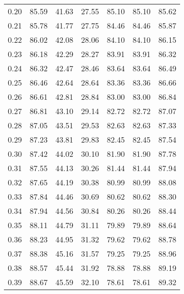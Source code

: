 \begin{tabular}{|c|c|c|c|c|c|c|}
      0.20 &     85.59 &     41.63 &      27.55 &   85.10 &      85.10 &         85.62 \\
      0.21 &     85.78 &     41.77 &      27.75 &   84.46 &      84.46 &         85.87 \\
      0.22 &     86.02 &     42.08 &      28.06 &   84.10 &      84.10 &         86.15 \\
      0.23 &     86.18 &     42.29 &      28.27 &   83.91 &      83.91 &         86.32 \\
      0.24 &     86.32 &     42.47 &      28.46 &   83.64 &      83.64 &         86.49 \\
      0.25 &     86.46 &     42.64 &      28.64 &   83.36 &      83.36 &         86.66 \\
      0.26 &     86.61 &     42.81 &      28.84 &   83.00 &      83.00 &         86.84 \\
      0.27 &     86.81 &     43.10 &      29.14 &   82.72 &      82.72 &         87.07 \\
      0.28 &     87.05 &     43.51 &      29.53 &   82.63 &      82.63 &         87.33 \\
      0.29 &     87.23 &     43.81 &      29.83 &   82.45 &      82.45 &         87.54 \\
      0.30 &     87.42 &     44.02 &      30.10 &   81.90 &      81.90 &         87.78 \\
      0.31 &     87.55 &     44.13 &      30.26 &   81.44 &      81.44 &         87.94 \\
      0.32 &     87.65 &     44.19 &      30.38 &   80.99 &      80.99 &         88.08 \\
      0.33 &     87.84 &     44.46 &      30.69 &   80.62 &      80.62 &         88.30 \\
      0.34 &     87.94 &     44.56 &      30.84 &   80.26 &      80.26 &         88.44 \\
      0.35 &     88.11 &     44.79 &      31.11 &   79.89 &      79.89 &         88.64 \\
      0.36 &     88.23 &     44.95 &      31.32 &   79.62 &      79.62 &         88.78 \\
      0.37 &     88.38 &     45.16 &      31.57 &   79.25 &      79.25 &         88.96 \\
      0.38 &     88.57 &     45.44 &      31.92 &   78.88 &      78.88 &         89.19 \\
      0.39 &     88.67 &     45.59 &      32.10 &   78.61 &      78.61 &         89.32 \\

\end{tabular}
